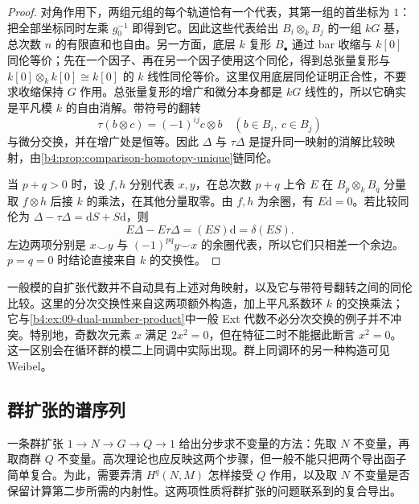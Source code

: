 \begin{proof}
	对角作用下，两组元组的每个轨道恰有一个代表，其第一组的首坐标为 \(1\)：把全部坐标同时左乘 \(g_0^{-1}\) 即得到它。因此这些代表给出 \(B_i\otimes_kB_j\) 的一组 \(kG\) 基，总次数 \(n\) 的有限直和也自由。另一方面，底层 \(k\) 复形 \(B_\bullet\) 通过 bar 收缩与 \(k[0]\) 同伦等价；先在一个因子、再在另一个因子使用这个同伦，得到总张量复形与 \(k[0]\otimes_k k[0]\cong k[0]\) 的 \(k\) 线性同伦等价。这里仅用底层同伦证明正合性，不要求收缩保持 \(G\) 作用。总张量复形的增广和微分本身都是 \(kG\) 线性的，所以它确实是平凡模 \(k\) 的自由消解。带符号的翻转
	\[
		\tau(b\otimes c)=(-1)^{ij}c\otimes b \quad(b\in B_i,\ c\in B_j)
	\]
	与微分交换，并在增广处是恒等。因此 \(\Delta\) 与 \(\tau\Delta\) 是提升同一映射的消解比较映射，由\cref{b4:prop:comparison-homotopy-unique}链同伦。

	当 \(p+q>0\) 时，设 \(f,h\) 分别代表 \(x,y\)，在总次数 \(p+q\) 上令 \(E\) 在 \(B_p\otimes_kB_q\) 分量取 \(f\otimes h\) 后接 \(k\) 的乘法，在其他分量取零。由 \(f,h\) 为余圈，有 \(E\mathrm{d}=0\)。若比较同伦为 \(\Delta-\tau\Delta=\mathrm{d}S+S\mathrm{d}\)，则
	\[
		E\Delta-E\tau\Delta=(ES)\mathrm{d}=\delta(ES).
	\]
	左边两项分别是 \(x\smile y\) 与 \((-1)^{pq}y\smile x\) 的余圈代表，所以它们只相差一个余边。\(p=q=0\) 时结论直接来自 \(k\) 的交换性。
\end{proof}

一般模的自扩张代数并不自动具有上述对角映射，以及它与带符号翻转之间的同伦比较。这里的分次交换性来自这两项额外构造，加上平凡系数环 \(k\) 的交换乘法；它与\cref{b4:ex:09-dual-number-product}中一般 Ext 代数不必分次交换的例子并不冲突。特别地，奇数次元素 \(x\) 满足 \(2x^2=0\)，但在特征二时不能据此断言 \(x^2=0\)。这一区别会在循环群的模二上同调中实际出现。群上同调环的另一种构造可见 Weibel\cite[Section 6.7.1, Theorem 6.7.11, Lemma 6.7.12]{Weibel1994HomologicalAlgebra}。

\subsection{群扩张的谱序列}
\label{b4:subsec:1104:02}

一条群扩张 \(1\to N\to G\to Q\to1\) 给出分步求不变量的方法：先取 \(N\) 不变量，再取商群 \(Q\) 不变量。高次理论也应反映这两个步骤，但一般不能只把两个导出函子简单复合。为此，需要弄清 \(H^q(N,M)\) 怎样接受 \(Q\) 作用，以及取 \(N\) 不变量是否保留计算第二步所需的内射性。这两项性质将群扩张的问题联系到的复合导出。

